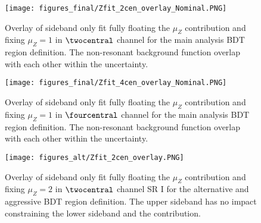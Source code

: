 \begin{figure}[htbp]
  \centering
 \texttt{[image: figures\_final/Zfit\_2cen\_overlay\_Nominal.PNG]}
\caption{Overlay of sideband only fit fully floating the $\mu_{Z}$ contribution and fixing $\mu_{Z}=1$ in $\twocentral$ channel for the main analysis BDT region definition. The non-resonant background function overlap with each other within the uncertainty.}
  \label{fig:2cen_overlay}
\end{figure}

\begin{figure}[htbp]
  \centering
 \texttt{[image: figures\_final/Zfit\_4cen\_overlay\_Nominal.PNG]}
\caption{Overlay of sideband only fit fully floating the $\mu_{Z}$ contribution and fixing $\mu_{Z}=1$ in $\fourcentral$ channel for the main analysis BDT region definition. The non-resonant background function overlap with each other within the uncertainty.}
  \label{fig:4cen_overlay}
\end{figure}


\begin{figure}[htbp]
  \centering
 \texttt{[image: figures\_alt/Zfit\_2cen\_overlay.PNG]}
\caption{Overlay of sideband only fit fully floating the $\mu_{Z}$ contribution and fixing $\mu_{Z}=2$ in $\twocentral$ channel SR I for the alternative and aggressive BDT region definition. The upper sideband has no impact constraining the lower sideband and the \zjets{} contribution.}
  \label{fig:SRI_overlay_sensitive}
\end{figure}

